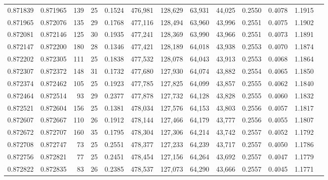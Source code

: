 \begin{tabular}{rrrrrrrrrrrrr}
0.871839 & 0.871965 &   139 &  25 &                                     0.1524 & 476,981 & 128,629 &  63,931 &  44,025 & 0.2550 & 0.4078 & 1.1915 \\
0.871965 & 0.872076 &   135 &  29 &                                     0.1768 & 477,116 & 128,494 &  63,960 &  43,996 & 0.2551 & 0.4075 & 1.1902 \\
0.872081 & 0.872146 &   125 &  30 &                                     0.1935 & 477,241 & 128,369 &  63,990 &  43,966 & 0.2551 & 0.4073 & 1.1891 \\
0.872147 & 0.872200 &   180 &  28 &                                     0.1346 & 477,421 & 128,189 &  64,018 &  43,938 & 0.2553 & 0.4070 & 1.1874 \\
0.872202 & 0.872305 &   111 &  25 &                                     0.1838 & 477,532 & 128,078 &  64,043 &  43,913 & 0.2553 & 0.4068 & 1.1864 \\
0.872307 & 0.872372 &   148 &  31 &                                     0.1732 & 477,680 & 127,930 &  64,074 &  43,882 & 0.2554 & 0.4065 & 1.1850 \\
0.872374 & 0.872462 &   105 &  25 &                                     0.1923 & 477,785 & 127,825 &  64,099 &  43,857 & 0.2555 & 0.4062 & 1.1840 \\
0.872464 & 0.872514 &    93 &  29 &                                     0.2377 & 477,878 & 127,732 &  64,128 &  43,828 & 0.2555 & 0.4060 & 1.1832 \\
0.872521 & 0.872604 &   156 &  25 &                                     0.1381 & 478,034 & 127,576 &  64,153 &  43,803 & 0.2556 & 0.4057 & 1.1817 \\
0.872607 & 0.872667 &   110 &  26 &                                     0.1912 & 478,144 & 127,466 &  64,179 &  43,777 & 0.2556 & 0.4055 & 1.1807 \\
0.872672 & 0.872707 &   160 &  35 &                                     0.1795 & 478,304 & 127,306 &  64,214 &  43,742 & 0.2557 & 0.4052 & 1.1792 \\
0.872708 & 0.872747 &    73 &  25 &                                     0.2551 & 478,377 & 127,233 &  64,239 &  43,717 & 0.2557 & 0.4050 & 1.1786 \\
0.872756 & 0.872821 &    77 &  25 &                                     0.2451 & 478,454 & 127,156 &  64,264 &  43,692 & 0.2557 & 0.4047 & 1.1779 \\
0.872822 & 0.872835 &    83 &  26 &                                     0.2385 & 478,537 & 127,073 &  64,290 &  43,666 & 0.2557 & 0.4045 & 1.1771 \\

\end{tabular}
